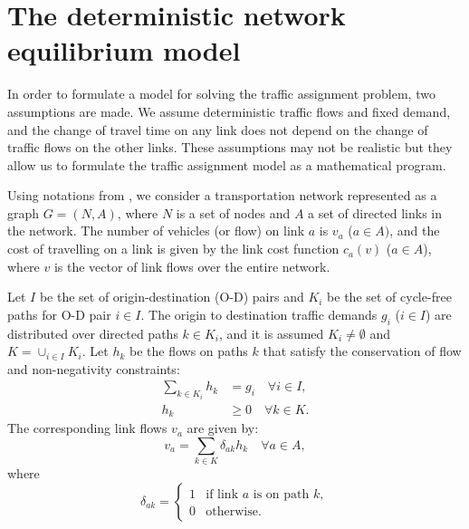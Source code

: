 \section{The deterministic network equilibrium model}
In order to formulate a model for solving the traffic assignment problem,
two assumptions are made.
We assume deterministic traffic flows and fixed demand,
and the change of travel time on any link does not depend on the change of traffic flows on the other links.
These assumptions may not be realistic  but they allow us to formulate the traffic assignment model as a mathematical program.

Using notations from \citet{Florian, Florian2008},
we consider a transportation network represented as a graph $G = (N, A)$,
where $N$ is a set of nodes and $A$ a set of directed links in the network.
The number of vehicles (or flow) on link $a$ is $v_a$ ($a \in A)$,
and the cost of travelling on a link is given by the link cost function $c_a(v)$ ($a \in A$),
where $v$ is the vector of link flows over the entire network.

Let $I$ be the set of origin-destination (O-D) pairs
and $K_i$ be the set of cycle-free paths for O-D pair $i \in I$.
The origin to destination traffic demands $g_i$ ($i \in I$) are distributed over directed paths $k \in K_i$,
and it is assumed $K_i \neq \emptyset$ and $K = \cup_{i \in I} K_i$.
Let $h_k$ be the flows on paths $k$ that satisfy the conservation of flow and non-negativity constraints:
\begin{align} \label{model_1}
    \sum_{k \in K_i} h_k & = g_i \quad \forall i \in I,  \\
    h_k &\geq 0 \quad \forall k \in K.
\end{align}
The corresponding link flows $v_a$ are given by:
\begin{equation}
    v_a = \sum_{k \in K} \delta_{ak} h_k \quad \forall a \in A,
\end{equation}
where
\begin{equation} \label{model_4}
    \delta_{ak} = 
    \begin{cases}
        1 & \text{if link $a$ is on path $k$},\\
        0 & \text{otherwise}.
    \end{cases}
\end{equation}

